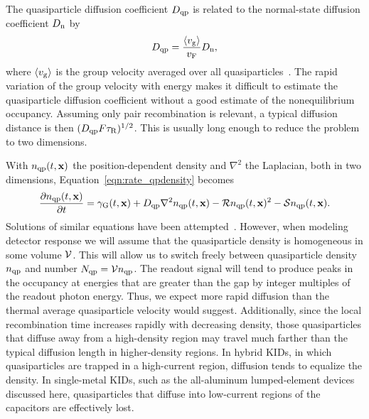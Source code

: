 The quasiparticle diffusion coefficient $D_{\mathrm{qp}}$ is related to the normal-state diffusion coefficient $D_{\mathrm{n}}$ by
\begin{equation}
D_{\mathrm{qp}}
  =
  \frac{\expval{v_{\mathrm{g}}}}{v_{\mathrm{F}}} D_{\mathrm{n}},
\end{equation}
where $\expval{v_{\mathrm{g}}}$ is the group velocity averaged over all quasiparticles~\autocite{Ullom1998PRB}.
The rapid variation of the group velocity with energy makes it difficult to estimate the quasiparticle diffusion coefficient without a good estimate of the nonequilibrium occupancy.
Assuming only pair recombination is relevant, a typical diffusion distance is then
$(D_{\mathrm{qp}} F \tau_\mathrm{R})^{1/2}$.
This is usually long enough to reduce the problem to two dimensions.

With $n_{\mathrm{qp}}(t, \vb{x})$ the position-dependent density and $\nabla^2$ the Laplacian, both in two dimensions, Equation~\ref{eqn:rate_qpdensity} becomes
\begin{equation}
\pdv{n_{\mathrm{qp}}(t, \vb{x})}{t}
  =
  \gamma_{\mathrm{G}}(t, \vb{x})
  + D_{\mathrm{qp}} \nabla^2 n_{\mathrm{qp}}(t, \vb{x})
  -\mathcal{R} n_{\mathrm{qp}}(t, \vb{x})^2
  -\mathcal{S} n_{\mathrm{qp}}(t, \vb{x}).
\label{eqn:rate_qpdensity_diffusion}
\end{equation}
Solutions of similar equations have been attempted~\autocite{Wang2014NatComm,Nsanzineza2014PRL}.
However, when modeling detector response we will assume that the quasiparticle density is homogeneous in some volume $\mathcal{V}$.
This will allow us to switch freely between quasiparticle density $n_{\mathrm{qp}}$ and number $N_{\mathrm{qp}} = \mathcal{V} n_{\mathrm{qp}}$.
The readout signal will tend to produce peaks in the occupancy at energies that are greater than the gap by integer multiples of the readout photon energy.
Thus, we expect more rapid diffusion than the thermal average quasiparticle velocity would suggest.
Additionally, since the local recombination time increases rapidly with decreasing density, those quasiparticles that diffuse away from a high-density region may travel much farther than the typical diffusion length in higher-density regions.
In hybrid KIDs, in which quasiparticles are trapped in a high-current region, diffusion tends to equalize the density.
In single-metal KIDs, such as the all-aluminum lumped-element devices discussed here, quasiparticles that diffuse into low-current regions of the capacitors are effectively lost.
